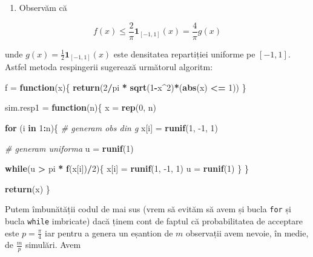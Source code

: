 \documentclass[]{article}
\newenvironment{Shaded}{\begin{snugshade}}{\end{snugshade}}
\newcommand{\CommentTok}[1]{\textcolor[rgb]{0.56,0.35,0.01}{\textit{#1}}}
\newcommand{\ControlFlowTok}[1]{\textcolor[rgb]{0.13,0.29,0.53}{\textbf{#1}}}
\newcommand{\DecValTok}[1]{\textcolor[rgb]{0.00,0.00,0.81}{#1}}
\newcommand{\KeywordTok}[1]{\textcolor[rgb]{0.13,0.29,0.53}{\textbf{#1}}}
\newcommand{\NormalTok}[1]{#1}
\newcommand{\OperatorTok}[1]{\textcolor[rgb]{0.81,0.36,0.00}{\textbf{#1}}}
\newcommand{\StringTok}[1]{\textcolor[rgb]{0.31,0.60,0.02}{#1}}
\providecommand{\tightlist}{%
  \setlength{\itemsep}{0pt}\setlength{\parskip}{0pt}}
\begin{document}
\begin{enumerate}
\def\labelenumi{\arabic{enumi}.}
\tightlist
\item
  Observăm că
\end{enumerate}

\[
  f(x) \leq \frac{2}{\pi}\mathbf{1}_{[-1,1]}(x) = \frac{4}{\pi}g(x)
\]

unde \(g(x) = \frac{1}{2}\mathbf{1}_{[-1,1]}(x)\) este densitatea
repartiției uniforme pe \([-1,1]\). Astfel metoda respingerii sugerează
următorul algoritm:

\begin{Shaded}
\begin{Highlighting}[]
\NormalTok{f =}\StringTok{ }\ControlFlowTok{function}\NormalTok{(x)\{}
  \KeywordTok{return}\NormalTok{(}\DecValTok{2}\OperatorTok{/}\NormalTok{pi }\OperatorTok{*}\StringTok{ }\KeywordTok{sqrt}\NormalTok{(}\DecValTok{1}\OperatorTok{-}\NormalTok{x}\OperatorTok{^}\DecValTok{2}\NormalTok{)}\OperatorTok{*}\NormalTok{(}\KeywordTok{abs}\NormalTok{(x) }\OperatorTok{<=}\StringTok{ }\DecValTok{1}\NormalTok{))}
\NormalTok{\}}

\NormalTok{sim.resp1 =}\StringTok{ }\ControlFlowTok{function}\NormalTok{(n)\{}
\NormalTok{  x =}\StringTok{ }\KeywordTok{rep}\NormalTok{(}\DecValTok{0}\NormalTok{, n)}
  
  \ControlFlowTok{for}\NormalTok{ (i }\ControlFlowTok{in} \DecValTok{1}\OperatorTok{:}\NormalTok{n)\{}
    \CommentTok{# generam obs din g}
\NormalTok{    x[i] =}\StringTok{ }\KeywordTok{runif}\NormalTok{(}\DecValTok{1}\NormalTok{, }\DecValTok{-1}\NormalTok{, }\DecValTok{1}\NormalTok{)}
    
    \CommentTok{# generam uniforma}
\NormalTok{    u =}\StringTok{ }\KeywordTok{runif}\NormalTok{(}\DecValTok{1}\NormalTok{)}
    
    \ControlFlowTok{while}\NormalTok{(u }\OperatorTok{>}\StringTok{ }\NormalTok{pi }\OperatorTok{*}\StringTok{ }\KeywordTok{f}\NormalTok{(x[i])}\OperatorTok{/}\DecValTok{2}\NormalTok{)\{}
\NormalTok{      x[i] =}\StringTok{ }\KeywordTok{runif}\NormalTok{(}\DecValTok{1}\NormalTok{, }\DecValTok{-1}\NormalTok{, }\DecValTok{1}\NormalTok{)    }
\NormalTok{      u =}\StringTok{ }\KeywordTok{runif}\NormalTok{(}\DecValTok{1}\NormalTok{)}
\NormalTok{    \}}
\NormalTok{  \}}
  
  \KeywordTok{return}\NormalTok{(x)}
\NormalTok{\}}
\end{Highlighting}
\end{Shaded}

Putem îmbunătății codul de mai sus (vrem să evităm să avem și bucla
\texttt{for} și bucla \texttt{while} imbricate) dacă ținem cont de
faptul că probabilitatea de acceptare este \(p = \frac{\pi}{4}\) iar
pentru a genera un eșantion de \(m\) observații avem nevoie, în medie,
de \(\frac{m}{p}\) simulări. Avem
\end{document}
